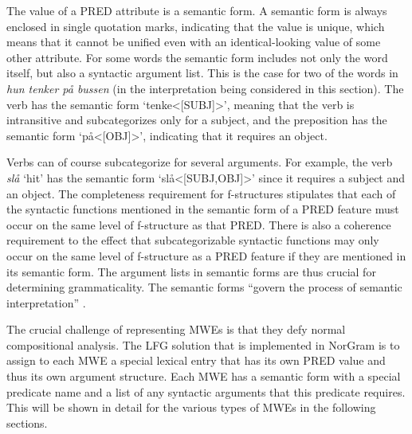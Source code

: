 \documentclass[output=paper]{langsci/langscibook}
\begin{document}
The value of a PRED attribute is a semantic form.
A semantic form is always enclosed in single quotation marks, indicating that the value is unique, which means that it cannot be unified even with an identical-looking value of some other attribute.
For some words the semantic form includes not only the word itself, but also a syntactic argument list.
This is the case for two of the words in \textit{hun tenker på bussen} (in the interpretation being considered in this section).
The verb has the semantic form `tenke<[SUBJ]>', meaning that the verb is intransitive and subcategorizes only for a subject, and the preposition has the semantic form `på<[OBJ]>', indicating that it requires an object.

Verbs can of course subcategorize for several arguments.
For example, the verb \textit{slå} `hit' has the semantic form `slå<[SUBJ,OBJ]>' since it requires a subject and an object.
The completeness requirement for f-structures stipulates that each of the syntactic functions mentioned in the semantic form of a PRED feature must occur on the same level of f-structure as that PRED.
There is also a coherence requirement to the effect that subcategorizable syntactic functions may only occur on the same level of f-structure as a PRED feature if they are mentioned in its semantic form.
The argument lists in semantic forms are thus crucial for determining grammaticality.
The semantic forms ``govern the process of semantic interpretation” \citep[177]{kaplanbresnan82}.

The crucial challenge of representing MWEs is that they defy normal compositional analysis.
The LFG solution that is implemented in NorGram is to assign to each MWE a special lexical entry that has its own PRED value and thus its own argument structure.
Each MWE has a semantic form with a special predicate name and a list of any syntactic arguments that this predicate requires.
This will be shown in detail for the various types of MWEs in the following sections.

%
%
\end{document}

